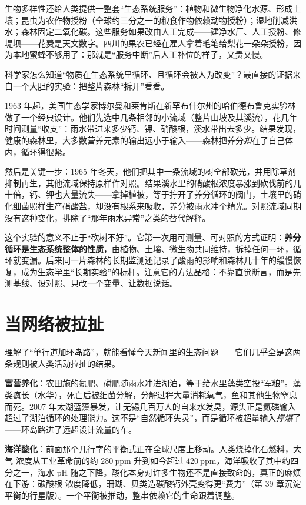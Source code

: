 生物多样性还给人类提供一整套“生态系统服务”：植物和微生物净化水源、形成土壤；昆虫为农作物授粉（全球约三分之一的粮食作物依赖动物授粉）；湿地削减洪水；森林固定二氧化碳。这些服务如果改由人工完成——建净水厂、人工授粉、修堤坝——花费是天文数字。四川的果农已经在雇人拿着毛笔给梨花一朵朵授粉，因为本地蜜蜂不够用了：那就是“服务中断”后人工补位的样子，又贵又慢。

\begin{zhengju}
科学家怎么知道“物质在生态系统里循环、且循环会被人为改变”？最直接的证据来自一个大胆的实验：把整片森林“拆开”看看。

1963 年起，美国生态学家博尔曼和莱肯斯在新罕布什尔州的哈伯德布鲁克实验林做了一个经典设计。他们先选中几条相邻的小流域（整片山坡及其溪流），花几年时间测量“收支”：雨水带进来多少钙、钾、硝酸根，溪水带出去多少。结果发现，健康的森林里，大多数营养元素的输出远小于输入——森林把养分\emph{扣}在了自己体内，循环得很紧。

然后是关键一步：1965 年冬天，他们把其中一条流域的树全部砍光，并用除草剂抑制再生，其他流域保持原样作对照。结果溪水里的硝酸根浓度暴涨到砍伐前的几十倍，钙、钾也大量流失——拿掉植被，等于拧开了养分循环的阀门，土壤里的硝化细菌照样生产硝酸盐，却没有根系来吸收，养分被雨水冲个精光。对照流域同期没有这种变化，排除了“那年雨水异常”之类的替代解释。

这个实验的意义不止于“砍树不好”。它第一次用可测量、可对照的方式证明：\textbf{养分循环是生态系统整体的性质}，由植物、土壤、微生物共同维持，拆掉任何一环，循环就变漏。后来同一片森林的长期监测还记录了酸雨的影响和森林几十年的缓慢恢复，成为生态学里“长期实验”的标杆。注意它的方法品格：不靠直觉断言，而是先测基线、设对照、只改一个变量、让数据说话。
\end{zhengju}

\section{当网络被拉扯}

理解了“单行道加环岛路”，就能看懂今天新闻里的生态问题——它们几乎全是这两条规则被人类活动拉扯的结果。

\textbf{富营养化}：农田施的氮肥、磷肥随雨水冲进湖泊，等于给水里藻类空投“军粮”。藻类疯长（水华），死亡后被细菌分解，分解过程大量消耗氧气，鱼和其他生物窒息而死。2007 年太湖蓝藻暴发，让无锡几百万人的自来水发臭，源头正是氮磷输入超过了湖泊循环的处理能力。这不是“自然循环失灵”，而是循环被超量输入\emph{撑爆}了——环岛路进了远超设计流量的车。

\textbf{海洋酸化}：前面那个几行字的平衡式正在全球尺度上移动。人类烧掉化石燃料，大气  浓度从工业革命前的约 $280\ \mathrm{ppm}$ 升到如今超过 $420\ \mathrm{ppm}$，海洋吸收了其中约四分之一，海水 pH 随之下降。酸化本身对许多生物还不是直接致命的，真正的麻烦在下游：碳酸根  浓度降低，珊瑚、贝类造碳酸钙外壳变得更“费力”（第 39 章沉淀平衡的行星版）。一个平衡被推动，整串依赖它的生命跟着调整。

